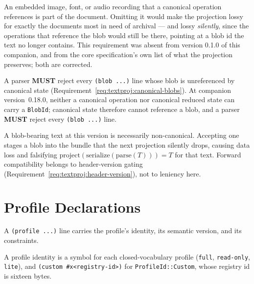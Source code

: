 \documentclass[11pt,letterpaper]{report}
\newcounter{requirement}[chapter]
\newcommand{\MUST}{\textbf{MUST}}
\begin{document}
\begin{rationale}
  An embedded image, font, or audio recording that a canonical operation
  references is part of the document. Omitting it would make the projection lossy
  for exactly the documents most in need of archival --- and lossy \emph{silently},
  since the operations that reference the blob would still be there, pointing at a
  blob id the text no longer contains. This requirement was absent from version
  0.1.0 of this companion, and from the core specification's own list of what the
  projection preserves; both are corrected.
\end{rationale}

\begin{requirement}
  \label{req:textproj:reject-unreferenced-blobs}
  A parser \MUST{} reject every \texttt{(blob ...)} line whose blob is
  unreferenced by canonical state
  (Requirement~\ref{req:textproj:canonical-blobs}). At companion
  version~0.18.0, neither a canonical operation nor canonical reduced state can
  carry a \texttt{BlobId}; canonical state therefore cannot reference a blob,
  and a parser \MUST{} reject every \texttt{(blob ...)} line.
\end{requirement}

\begin{rationale}
  A blob-bearing text at this version is necessarily non-canonical. Accepting
  one stages a blob into the bundle that the next projection silently drops,
  causing data loss and falsifying
  $\textrm{project}(\textrm{serialize}(\textrm{parse}(T))) = T$ for that text.
  Forward compatibility belongs to header-version gating
  (Requirement~\ref{req:textproj:header-version}), not to leniency here.
\end{rationale}

\section{Profile Declarations}
\label{sec:content:profiles}

A \texttt{(profile ...)} line carries the profile's identity, its semantic
version, and its constraints.

\begin{requirement}
  \label{req:textproj:profile-id}
  A profile identity is a symbol for each closed-vocabulary profile
  (\texttt{full}, \texttt{read-only}, \texttt{lite}), and
  \texttt{(custom \#x<registry-id>)} for \texttt{ProfileId::Custom}, whose
  registry id is sixteen bytes.
\end{requirement}
\end{document}
